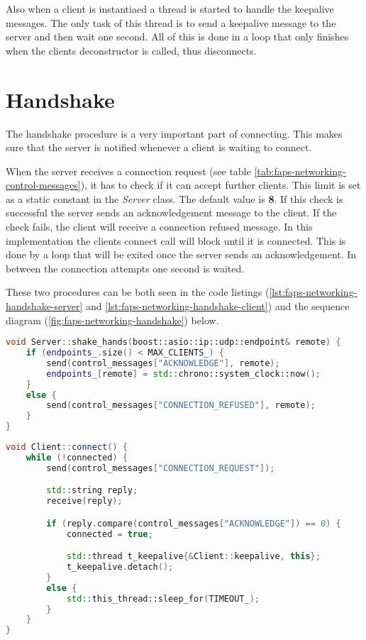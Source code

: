 Also when a client is instantiaed a thread is started to handle the keepalive messages. The only task of this thread is to send a keepalive message to the server and then wait one second. All of this is done in a loop that
only finishes when the clients deconstructor is called, thus disconnects.

\section {Handshake}

The handshake procedure is a very important part of connecting. This makes sure that the server is notified whenever a client is waiting to connect.

When the server receives a connection request (see table \vref{tab:faps-networking-control-messages}), it has to check if it can accept further clients. This limit is set as a static constant in the \textit{Server} class. The
default value is \textbf{8}. If this check is successful the server sends an acknowledgement message to the client. If the check fails, the client will receive a connection refused message. In this implementation the
clients connect call will block until it is connected. This is done by a loop that will be exited once the server sends an acknowledgement. In between the connection attempts one second is waited.

These two procedures can be both seen in the code listings (\vref{lst:faps-networking-handshake-server} and \vref{lst:faps-networking-handshake-client}) and the sequence diagram (\vref{fig:faps-networking-handshake}) below.

\begin{minipage}{\linewidth}
\begin{lstlisting}[caption={Server handshake method}, label=lst:faps-networking-handshake-server, captionpos=b, language=C++]
void Server::shake_hands(boost::asio::ip::udp::endpoint& remote) {
    if (endpoints_.size() < MAX_CLIENTS_) {
        send(control_messages["ACKNOWLEDGE"], remote);
        endpoints_[remote] = std::chrono::system_clock::now();
    }
    else {
        send(control_messages["CONNECTION_REFUSED"], remote);
    }
}
\end{lstlisting}
\end{minipage}

\begin{minipage}{\linewidth}
\begin{lstlisting}[caption={Client handshake method}, label=lst:faps-networking-handshake-client, captionpos=b, language=C++]
void Client::connect() {
    while (!connected) {
        send(control_messages["CONNECTION_REQUEST"]);

        std::string reply;
        receive(reply);

        if (reply.compare(control_messages["ACKNOWLEDGE"]) == 0) {
            connected = true;

            std::thread t_keepalive{&Client::keepalive, this};
            t_keepalive.detach();
        }
        else {
            std::this_thread::sleep_for(TIMEOUT_);
        }
    }
}
\end{lstlisting}
\end{minipage}

